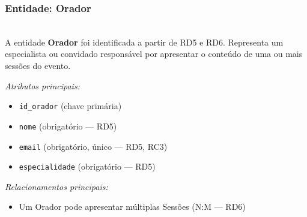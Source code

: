 \documentclass[runningheads]{llncs}
\begin{document}
                \vspace{0.4cm}
                \noindent\begin{minipage}{\textwidth}
                
                    \subsubsection{Entidade: Orador}\mbox{}\\
                A entidade \textbf{Orador} foi identificada a partir de RD5 e RD6. Representa um
                especialista ou convidado responsável por apresentar o conteúdo de uma ou mais sessões
                do evento.

                \vspace{0.2cm}
                \noindent\textit{Atributos principais:}
                \begin{itemize}
                    \item \texttt{id\_orador} (chave primária)
                    \item \texttt{nome} (obrigatório --- RD5)
                    \item \texttt{email} (obrigatório, único --- RD5, RC3)
                    \item \texttt{especialidade} (obrigatório --- RD5)
                \end{itemize}

                \vspace{0.2cm}
                \noindent\textit{Relacionamentos principais:}
                \begin{itemize}
                    \item Um Orador pode apresentar múltiplas Sessões (N:M --- RD6)
                \end{itemize}
                \end{minipage}
\end{document}
